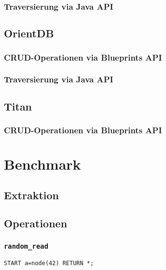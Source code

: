 \subsubsection{Traversierung via Java API}

\subsection{OrientDB}

\subsubsection{CRUD-Operationen via Blueprints API}
\label{anh:orientdb_blueprints_api}

\subsubsection{Traversierung via Java API}
\label{anh:orientdb_traverse_java}

\subsection*{Titan}

\subsubsection{CRUD-Operationen via Blueprints API}
\label{anh:titan_blueprints_api}

\section{Benchmark}

\subsection{Extraktion}
\label{anh:extraction}

\subsection{Operationen}
\label{anh:queries}

\subsubsection*{\texttt{random\_read}}

\begin{lstlisting}
START a=node(42) RETURN *;
\end{lstlisting}


